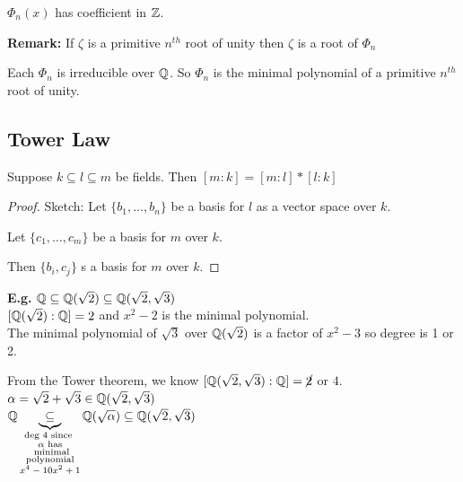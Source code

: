\documentclass[11pt]{article}
\begin{document}
\begin{cor}
	$\Phi_n(x)$ has coefficient in $\mathbb{Z}$.
\end{cor}
$ $\\[-0.5em]
\textbf{Remark:} If $\zeta$ is a primitive $n^{th}$ root of unity then $\zeta$ is a root of $\Phi_n$
\begin{theorem}
Each $\Phi_n$ is irreducible over $\mathbb{Q}$.
	So $\Phi_n$ is the minimal polynomial of a primitive $n^{th}$ root of unity.
\end{theorem}


\subsection{Tower Law}

\begin{theorem}
	Suppose $k \subseteq l \subseteq m $ be fields. Then $[m:k] = [m:l]*[l:k]$
\end{theorem}

\begin{proof}
	Sketch: Let $\{ b_1, \dots, b_n \}$ be a basis for $l$ as a vector space over $k$.

	Let $\{c_1, \dots, c_m \}$ be a basis for $m$ over $k$.

	Then $\{ b_i, c_j\}$ s a basis for $m$ over $k$.
\end{proof}
$ $\\
\textbf{E.g.} $\mathbb{Q} \subseteq \mathbb{Q}(\sqrt{2}) \subseteq \mathbb{Q}(\sqrt{2},\sqrt{3}) $
$ $\\[-0.5em]

$[\mathbb{Q}(\sqrt{2}) : \mathbb{Q}] = 2 $ and $x^2 - 2$ is the minimal polynomial.
$ $\\[-0.5em]

The minimal polynomial of $\sqrt{3} $ over $\mathbb{Q}(\sqrt{2})$ is a factor of $x^2 -3$ so degree is 1 or 2.

From the Tower theorem, we know $[\mathbb{Q}(\sqrt{2},\sqrt{3}):\mathbb{Q}] = \cancel{2}$ or $4$.
$ $\\[-.5em]

$\alpha = \sqrt{2} + \sqrt{3} \in \mathbb{Q} (\sqrt{2}, \sqrt{3})$
$ $\\[-.5em]

$\mathbb{Q} \underbrace{\subseteq}_{\substack{\text{deg 4 since } \\ \text{$\alpha$ has} \\ \text{ minimal} \\ \text{polynomial}\\ \text{$x^4 -10x^2 + 1$} }} \mathbb{Q}(\sqrt{\alpha}) \subseteq \mathbb{Q}(\sqrt{2},\sqrt{3}) $
$ $\\
\end{document}
